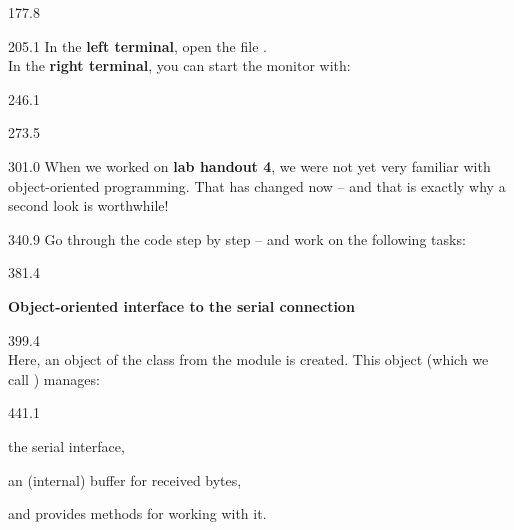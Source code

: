 \documentclass{aslab}
\begin{document}
\begin{region}{177.8}
\end{region}

\begin{region}[pitch=14.3]{205.1}
In the \textbf{left terminal}, open the file .\\
In the \textbf{right terminal}, you can start the monitor with:
\end{region}

\begin{region}{246.1}
\end{region}

\begin{region}{273.5}
\end{region}

\begin{region}[pitch=13.3]{301.0}
When we worked on \textbf{lab handout 4}, we were not yet very familiar with
object-oriented programming. That has changed now -- and that is exactly
why a second look is worthwhile!
\end{region}

\begin{region}[pitch=13.2]{340.9}
Go through the code  step by step -- and work on the
following tasks:
\end{region}

\begin{region}{381.4}
\begin{tasks}
\item \textbf{Object-oriented interface to the serial connection}
\end{tasks}
\end{region}

\begin{region}[x=74.7,right=0,pitch=13.5]{399.4}
\\
Here, an object of the class  from the module  is
created. This object (which we call ) manages:
\end{region}

\begin{region}[x=74.7,right=0,pitch=13.15]{441.1}
\begin{dotlist}
\item the serial interface,
\item an (internal) buffer for received bytes,
\item and provides methods for working with it.
\end{dotlist}
\end{region}
\end{document}
